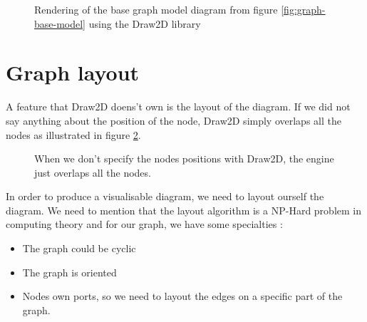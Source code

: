 \begin{figure}[H]
  \centering
  \caption[Render of the base graph model using the Draw2D library]{Rendering of
    the base graph model diagram from figure \ref{fig:graph-base-model} using
    the Draw2D library}
  \label{fig:base-graph-model-html-draw2d}
\end{figure}

\section{Graph layout}
\label{sec:graph-layout}

A feature that Draw2D doens't own is the layout of the diagram. If we did not
say anything about the position of the node, Draw2D simply overlaps all the nodes
 as illustrated in figure \ref{fig:draw2d_overlapping}.

\begin{figure}[H]
  \centering
  \caption[Overlapping of nodes by Draw2D]{When we don't specify the
    nodes positions with Draw2D, the engine just overlaps all the nodes.}
  \label{fig:draw2d_overlapping}
\end{figure}

In order to produce a visualisable diagram, we need to layout ourself the
diagram. We need to mention that the layout algorithm is a NP-Hard problem in
computing theory\cite{Tamassia:2007:HGD:1202383} and for our graph, we have some
specialties :

\begin{itemize}
\item The graph could be cyclic
\item The graph is oriented
\item Nodes own ports, so we need to layout the edges on a specific part of the graph.
\end{itemize}

